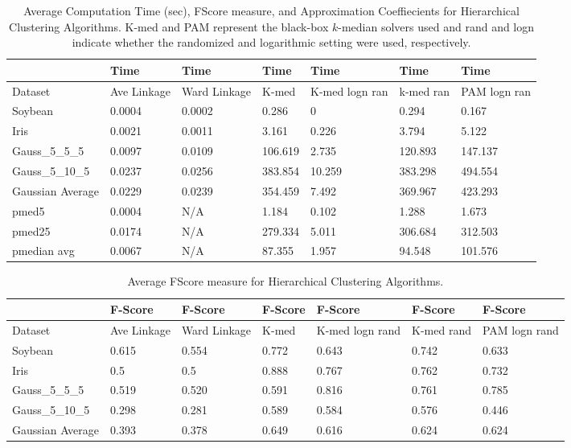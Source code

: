 \documentclass[conference, 10pt, final]{IEEEtran}
\begin{document}
\begin{table*}[!t]
\label{fig:hier_results_comp}
\caption{Average Computation Time (sec), FScore measure, and Approximation Coeffiecients for Hierarchical Clustering Algorithms. K-med and PAM represent the black-box $k$-median solvers used and rand and logn indicate whether the randomized and logarithmic setting were used, respectively.}
\centering
\begin{tabular}{ | l | l | l | l | l | l | l | }
\hline
	   & Time & Time & Time & Time & Time & Time \\ \hline
	Dataset & Ave Linkage & Ward Linkage & K-med & K-med logn ran & k-med ran & PAM logn ran \\ \hline
	Soybean & 0.0004 & 0.0002 & 0.286 & 0 & 0.294 & 0.167 \\ 
	Iris & 0.0021 & 0.0011 & 3.161 & 0.226 & 3.794 & 5.122 \\ 
	Gauss\_5\_5\_5 & 0.0097 & 0.0109 & 106.619 & 2.735 &120.893 & 147.137 \\
	Gauss\_5\_10\_5 & 0.0237 & 0.0256 & 383.854 & 10.259 & 383.298 & 494.554 \\
	Gaussian Average & 0.0229 & 0.0239 & 354.459 & 7.492 & 369.967 & 423.293 \\ 
	pmed5 &  0.0004 & N/A & 1.184 & 0.102 & 1.288 & 1.673   \\ 
	pmed25 & 0.0174 & N/A & 279.334 & 5.011 & 306.684 & 312.503   \\ 
	pmedian avg & 0.0067 & N/A &  87.355 & 1.957 & 94.548 & 101.576   \\ \hline
\end{tabular}
\end{table*}

\begin{table*}[!t]
\label{fig:hier_results_FScore}
\caption{Average FScore measure for Hierarchical Clustering Algorithms.}
\centering
\begin{tabular}{ | l | l | l | l | l | l | l | }
\hline
	   & F-Score & F-Score & F-Score & F-Score & F-Score & F-Score \\ \hline
	Dataset & Ave Linkage & Ward Linkage & K-med & K-med logn rand & K-med rand & PAM logn rand \\ \hline
	Soybean & 0.615 & 0.554 & 0.772 & 0.643 & 0.742 & 0.633 \\ 
	Iris & 0.5 & 0.5 & 0.888 & 0.767 & 0.762 & 0.732 \\ 
	Gauss\_5\_5\_5 & 0.519 & 0.520 & 0.591 & 0.816 & 0.761 & 0.785 \\
	Gauss\_5\_10\_5 & 0.298 & 0.281 & 0.589 & 0.584 & 0.576 & 0.446 \\
	Gaussian Average & 0.393 & 0.378 & 0.649 & 0.616 & 0.624 & 0.624 \\ \hline
\end{tabular}
\end{table*}
\end{document}
